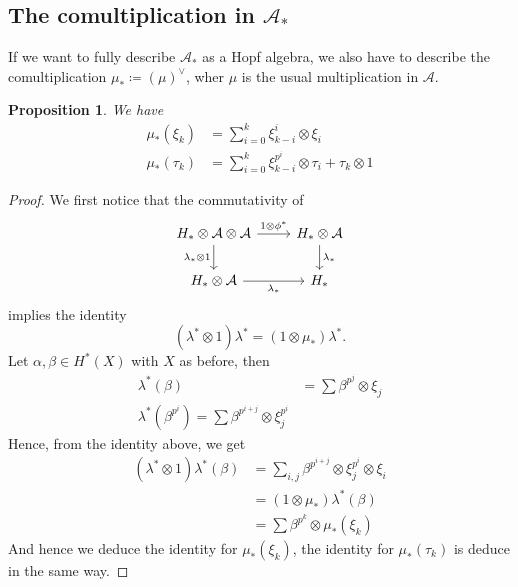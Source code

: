 \documentclass[11pt, a4paper]{article}
\newtheorem{propo}[thm]{Proposition}
\theoremstyle{plain}
\newtheorem*{proof}{Proof}
\begin{document}
\subsection{The comultiplication in $\mathcal{A}_\ast$}

If we want to fully describe $\mathcal{A}_\ast$ as a Hopf algebra, we also have to describe the comultiplication $\mu_{\ast}\coloneq  ( \mu)^{\vee}$, wher $\mu$ is the usual multiplication in $\mathcal{A}$.

\begin{propo}
We have
\begin{align*}
	\mu_\ast( \xi_k) &= \sum_{i=0}^{k}\xi_{k-i}^{i}\otimes \xi_i\\
\mu_\ast( \tau_k) &= \sum_{i=0}^{k}\xi_{k-i} ^{p^{i}}\otimes \tau_i + \tau_k \otimes 1
\end{align*}
\end{propo}
\begin{proof}
	We first notice that the commutativity of
\[\begin{tikzcd}
	{H_\ast\otimes \mathcal{A}\otimes \mathcal{A}} & {H_\ast\otimes \mathcal{A}} \\
	{H_\ast\otimes \mathcal{A}} & {H_\ast}
	\arrow["{1\otimes \phi^\ast}", from=1-1, to=1-2]
	\arrow["{\lambda_\ast\otimes1}"', from=1-1, to=2-1]
	\arrow["{\lambda_\ast}"', from=2-1, to=2-2]
	\arrow["{\lambda_\ast}", from=1-2, to=2-2]
\end{tikzcd}\]
implies the identity
\[ 
	( \lambda^{\ast}\otimes 1) \lambda^{\ast}= ( 1\otimes\mu_\ast) \lambda^{\ast}.
\]
	Let $\alpha,\beta \in H^{\ast}( X) $ with $X$ as before, then
\begin{align*}
	\lambda^{\ast}( \beta) &= \sum \beta^{p^{j}}\otimes \xi_j\\
	\lambda^{\ast}( \beta^{p^{i}}) = \sum \beta^{p^{i+j}}\otimes \xi_j^{p^{i}}
\end{align*}
Hence, from the identity above, we get
\begin{align*}
( \lambda^{\ast}\otimes 1) \lambda^{\ast}( \beta) &= \sum_{i,j} \beta^{p^{i+j}}\otimes \xi_j^{p^{i}}\otimes \xi_i\\
&= ( 1\otimes \mu_\ast) \lambda^{\ast}( \beta) \\
&= \sum \beta^{p^{k}}\otimes \mu_\ast( \xi_k) 
\end{align*}
And hence we deduce the identity for $\mu_\ast( \xi_k) $, the identity for $\mu_\ast( \tau_k) $ is deduce in the same way.

\end{proof}




\printbibliography
\end{document}
